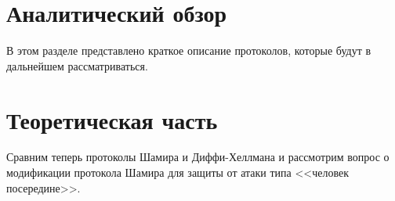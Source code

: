 \section{Аналитический обзор}
В этом разделе представлено краткое описание протоколов, которые будут в дальнейшем рассматриваться.

\section{Теоретическая часть}
Сравним теперь протоколы Шамира и Диффи-Хеллмана и рассмотрим вопрос о модификации протокола Шамира для защиты от атаки типа <<человек посередине>>.


\printbibliography[%
    heading=bibintoc%
]

\appendix
{}


